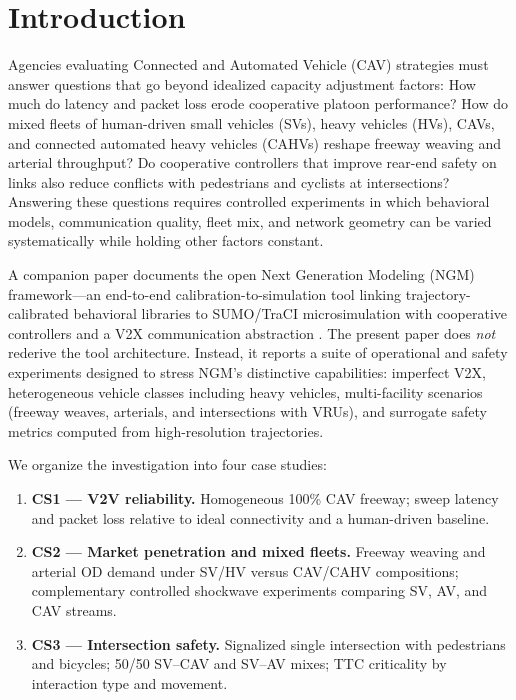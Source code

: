 \documentclass[numbered]{trbunofficial}
\begin{document}
\newpage

\section{Introduction}
\label{sec:intro}
Agencies evaluating Connected and Automated Vehicle (CAV) strategies must answer questions that
go beyond idealized capacity adjustment factors: How much do latency and packet loss erode
cooperative platoon performance? How do mixed fleets of human-driven small vehicles (SVs),
heavy vehicles (HVs), CAVs, and connected automated heavy vehicles (CAHVs) reshape freeway weaving
and arterial throughput? Do cooperative controllers that improve rear-end safety on links also
reduce conflicts with pedestrians and cyclists at intersections? Answering these questions
requires controlled experiments in which behavioral models, communication quality, fleet mix,
and network geometry can be varied systematically while holding other factors constant.

A companion paper documents the open Next Generation Modeling (NGM) framework---an end-to-end
calibration-to-simulation tool linking trajectory-calibrated behavioral libraries to SUMO/TraCI
microsimulation with cooperative controllers and a V2X communication abstraction
\cite{BeigiNGMTool2026}. The present paper does \emph{not} rederive the tool architecture.
Instead, it reports a suite of operational and safety experiments designed to stress NGM's
distinctive capabilities: imperfect V2X, heterogeneous vehicle classes including heavy
vehicles, multi-facility scenarios (freeway weaves, arterials, and intersections with VRUs),
and surrogate safety metrics computed from high-resolution trajectories.

We organize the investigation into four case studies:

\begin{enumerate}
  \item \textbf{CS1 --- V2V reliability.} Homogeneous 100\% CAV freeway; sweep latency and
        packet loss relative to ideal connectivity and a human-driven baseline.
  \item \textbf{CS2 --- Market penetration and mixed fleets.} Freeway weaving and arterial OD
        demand under SV/HV versus CAV/CAHV compositions; complementary controlled shockwave
        experiments comparing SV, AV, and CAV streams.
  \item \textbf{CS3 --- Intersection safety.} Signalized single intersection with pedestrians
        and bicycles; 50/50 SV--CAV and SV--AV mixes; TTC criticality by interaction type and
        movement.
\end{enumerate}
\end{document}
